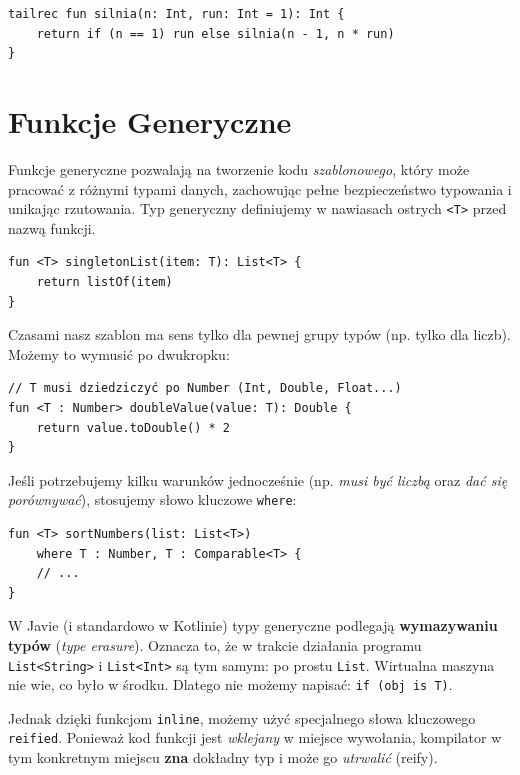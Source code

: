 \begin{verbatim}
tailrec fun silnia(n: Int, run: Int = 1): Int {
    return if (n == 1) run else silnia(n - 1, n * run)
}
\end{verbatim}

\section{Funkcje Generyczne}

Funkcje generyczne pozwalają na tworzenie kodu \textit{szablonowego}, który może pracować z różnymi typami danych, zachowując pełne bezpieczeństwo typowania i unikając rzutowania. Typ generyczny definiujemy w nawiasach ostrych \texttt{<T>} przed nazwą funkcji.

\begin{verbatim}
fun <T> singletonList(item: T): List<T> {
    return listOf(item)
}
\end{verbatim}

Czasami nasz szablon ma sens tylko dla pewnej grupy typów (np. tylko dla liczb). Możemy to wymusić po dwukropku:

\begin{verbatim}
// T musi dziedziczyć po Number (Int, Double, Float...)
fun <T : Number> doubleValue(value: T): Double {
    return value.toDouble() * 2
}
\end{verbatim}

Jeśli potrzebujemy kilku warunków jednocześnie (np. \textit{musi być liczbą} oraz \textit{dać się porównywać}), stosujemy słowo kluczowe \texttt{where}:

\begin{verbatim}
fun <T> sortNumbers(list: List<T>)
    where T : Number, T : Comparable<T> {
    // ...
}
\end{verbatim}

W Javie (i standardowo w Kotlinie) typy generyczne podlegają \textbf{wymazywaniu typów} (\textit{type erasure}). Oznacza to, że w trakcie działania programu \texttt{List<String>} i \texttt{List<Int>} są tym samym: po prostu \texttt{List}. Wirtualna maszyna nie wie, co było w środku. Dlatego nie możemy napisać: \texttt{if (obj is T)}.

Jednak dzięki funkcjom \texttt{inline}, możemy użyć specjalnego słowa kluczowego \texttt{reified}. Ponieważ kod funkcji jest \textit{wklejany} w miejsce wywołania, kompilator w tym konkretnym miejscu \textbf{zna} dokładny typ i może go \textit{utrwalić} (reify).

